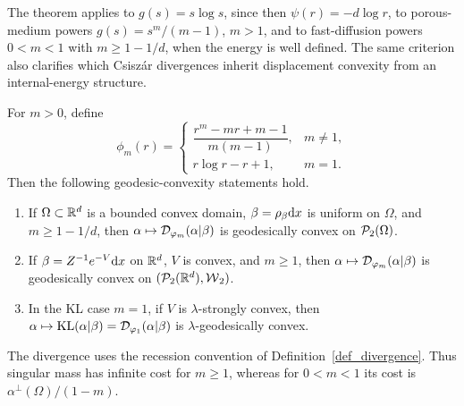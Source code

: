 The theorem applies to \(g(s)=s\log s\), since then \(\psi(r)=-d\log r\), to porous-medium powers \(g(s)=s^m/(m-1)\), \(m>1\), and to fast-diffusion powers \(0<m<1\) with \(m\geq1-1/d\), when the energy is well defined.
The same criterion also clarifies which Csisz\'ar divergences inherit displacement convexity from an internal-energy structure.
\begin{prop}\label{prop-power-divergences-geodesic-convexity}\label{prop-kl-gibbs-geodesic-convexity}
	For \(m>0\), define
	\[
		\phi_m(r)=
		\begin{cases}
			\dfrac{r^m-mr+m-1}{m(m-1)}, & m\neq1,\\[2mm]
			r\log r-r+1, & m=1.
		\end{cases}
	\]
	Then the following geodesic-convexity statements hold.
	\begin{enumerate}
	\item If \(\Omega\subset\mathbb{R}^d\) is a bounded convex domain, \(\beta=\rho_{\beta}\mathrm{d} x\) is uniform on \(\Omega\), and \(m\geq1-1/d\), then \(\alpha\mapsto\mathcal{D}_{\varphi_m}(\alpha|\beta)\) is geodesically convex on \(\mathcal{P}_2(\Omega)\).
		\item If \(\beta=Z^{-1}e^{-V}\mathrm{d} x\) on \(\mathbb{R}^d\), \(V\) is convex, and \(m\geq1\), then \(\alpha\mapsto\mathcal{D}_{\varphi_m}(\alpha|\beta)\) is geodesically convex on \((\mathcal{P}_2(\mathbb{R}^d),\operatorname{\mathcal{W}}_2)\).
		\item In the KL case \(m=1\), if \(V\) is \(\lambda\)-strongly convex, then \(\alpha\mapsto\operatorname{KL}(\alpha|\beta)=\mathcal{D}_{\varphi_1}(\alpha|\beta)\) is \(\lambda\)-geodesically convex.
	\end{enumerate}
	The divergence uses the recession convention of Definition~\ref{def_divergence}. Thus singular mass has infinite cost for \(m\geq1\), whereas for \(0<m<1\) its cost is \(\alpha^\perp(\Omega)/(1-m)\).
\end{prop}

